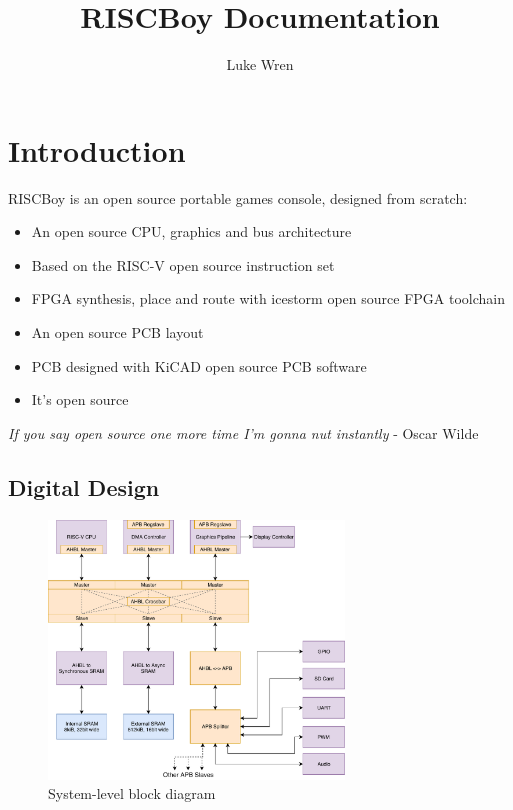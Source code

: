 \documentclass[notitlepage]{article}
\title{RISCBoy Documentation}
\author{Luke Wren}
\makeatletter
\newcommand*{\toccontents}{\@starttoc{toc}}
\makeatother
\begin{document}
\maketitle
\toccontents
\listoffigures
\newpage
{}

\section{Introduction}

RISCBoy is an open source portable games console, designed from scratch:

\begin{itemize}
\item An open source CPU, graphics and bus architecture
\item Based on the RISC-V open source instruction set
\item FPGA synthesis, place and route with icestorm open source FPGA toolchain
\item An open source PCB layout
\item PCB designed with KiCAD open source PCB software
\item It's open source
\end{itemize}

\begin{displayquote}
{\it If you say open source one more time I'm gonna nut instantly} - Oscar Wilde
\end{displayquote}

\subsection{Digital Design}

\begin{figure}[!htb]
\caption{System-level block diagram}
\label{diagram:system_arch}
\centering
\includegraphics[width=0.7\textwidth]{diagrams/system_arch.pdf}
\end{figure}
\end{document}
